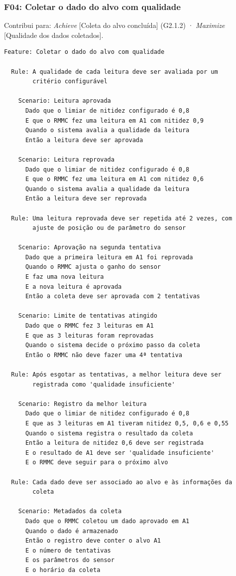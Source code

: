 \documentclass[a4paper, 12pt]{article}
\begin{document}
\Needspace{8cm}
\subsubsection{F04: Coletar o dado do alvo com qualidade}

Contribui para: \textit{Achieve} [Coleta do alvo concluída] (G2.1.2) · \textit{Maximize} [Qualidade dos dados coletados].

{\small
\begin{verbatim}
Feature: Coletar o dado do alvo com qualidade

  Rule: A qualidade de cada leitura deve ser avaliada por um
        critério configurável

    Scenario: Leitura aprovada
      Dado que o limiar de nitidez configurado é 0,8
      E que o RMMC fez uma leitura em A1 com nitidez 0,9
      Quando o sistema avalia a qualidade da leitura
      Então a leitura deve ser aprovada

    Scenario: Leitura reprovada
      Dado que o limiar de nitidez configurado é 0,8
      E que o RMMC fez uma leitura em A1 com nitidez 0,6
      Quando o sistema avalia a qualidade da leitura
      Então a leitura deve ser reprovada

  Rule: Uma leitura reprovada deve ser repetida até 2 vezes, com
        ajuste de posição ou de parâmetro do sensor

    Scenario: Aprovação na segunda tentativa
      Dado que a primeira leitura em A1 foi reprovada
      Quando o RMMC ajusta o ganho do sensor
      E faz uma nova leitura
      E a nova leitura é aprovada
      Então a coleta deve ser aprovada com 2 tentativas

    Scenario: Limite de tentativas atingido
      Dado que o RMMC fez 3 leituras em A1
      E que as 3 leituras foram reprovadas
      Quando o sistema decide o próximo passo da coleta
      Então o RMMC não deve fazer uma 4ª tentativa

  Rule: Após esgotar as tentativas, a melhor leitura deve ser
        registrada como 'qualidade insuficiente'

    Scenario: Registro da melhor leitura
      Dado que o limiar de nitidez configurado é 0,8
      E que as 3 leituras em A1 tiveram nitidez 0,5, 0,6 e 0,55
      Quando o sistema registra o resultado da coleta
      Então a leitura de nitidez 0,6 deve ser registrada
      E o resultado de A1 deve ser 'qualidade insuficiente'
      E o RMMC deve seguir para o próximo alvo

  Rule: Cada dado deve ser associado ao alvo e às informações da
        coleta

    Scenario: Metadados da coleta
      Dado que o RMMC coletou um dado aprovado em A1
      Quando o dado é armazenado
      Então o registro deve conter o alvo A1
      E o número de tentativas
      E os parâmetros do sensor
      E o horário da coleta
\end{verbatim}
}
\end{document}
